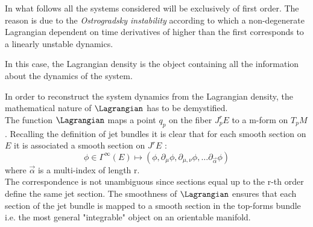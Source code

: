 \documentclass[Main]{subfiles}
\begin{document}
	\begin{NB}
	
		In what follows all the systems considered will be exclusively of first order.
		The reason is due to the \emph{Ostrogradsky instability} according to which a non-degenerate Lagrangian dependent on time derivatives of higher than the first corresponds to a linearly unstable dynamics.\cite{Motohashi2014}
	\end{NB}		
	In this case, the Lagrangian density is the object containing all the information about the dynamics of the system.

	\vspace{3mm}
	In order to reconstruct the system dynamics from the Lagrangian density, the mathematical nature of $\Lagrangian$  has to be demystified.\\
	The function $\Lagrangian$ maps a point $q_p$ on the fiber $J^r_p E$ to a m-form on $T_p M$.
	Recalling the definition of jet bundles it is clear that for each smooth section on $E$ it is associated a smooth section on $J^rE$ :
	\begin{displaymath}
		\phi \in \Gamma^\infty (E) \mapsto (\phi, \partial_\mu \phi, \partial_{\mu, \nu} \phi , \ldots \partial_{\vec{\alpha}}\phi)
	\end{displaymath}
	where  $\vec{\alpha}$ is a multi-index of length r.
	\\
	The correspondence is not unambiguous since sections equal up to the r-th order define the same jet section.
	The smoothness of $\Lagrangian$ ensures that each section of the jet bundle is mapped to a smooth section in the top-forms bundle i.e. the most general "integrable" object on an orientable manifold.
	
\end{document}

